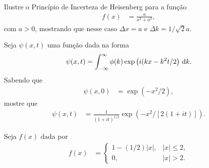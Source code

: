 \documentclass[a4paper,12pt, leqno, answers]{exam}
\begin{document}
\begin{questions}
    \question Ilustre o Princ\'{i}pio de Incerteza de Heisenberg para a
    fun\c{c}\~{a}o
    \begin{align*}
        f(x) &= \frac{a}{x^2 + a^2},
    \end{align*}
    com $a > 0$, mostrando que nesse caso $\Delta x = a$ e $\Delta k = 1 /
    \sqrt{2} a$.
    \begin{solution}
    \end{solution}

    \question Seja $\psi(x, t)$ uma fun\c{c}\~{a}o dada na forma
    \begin{align*}
        \psi(x, t) = \int_{-\infty}^\infty \phi(k) \exp\left( i (k x - k^2 t / 2
        \right) \, \mathrm{d}k.
    \end{align*}
    Sabendo que
    \begin{align*}
        \psi(x, 0) &= \exp(-x^2 / 2),
    \end{align*}
    mostre que
    \begin{align*}
        \psi(x, t) &= \frac{1}{(1 + i t)^{1/2}} \exp\left( -x^2 / \left[ 2 (1 +
        i t) \right] \right).
    \end{align*}

    \question[T3 de 2011] Seja $f(x)$ dada por
    \begin{align*}
        f(x) &= \begin{cases}
            1 - \left( 1/2 \right) |x|, & |x| \leq 2, \\
            0, & |x| > 2.
        \end{cases}
    \end{align*}
    \begin{parts}

\end{parts}
\end{questions}
\end{document}

